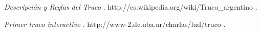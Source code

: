 \documentclass[12pt,a4paper]{article}
\begin{document}

\begin{thebibliography}{9}

	 \emph{Descripci\'on y Reglas del Truco }. 
	http://es.wikipedia.org/wiki/Truco\_argentino .

	 \emph{Primer truco interactivo }. 
	http://www-2.dc.uba.ar/charlas/lud/truco .


\end{thebibliography}
\end{document}
